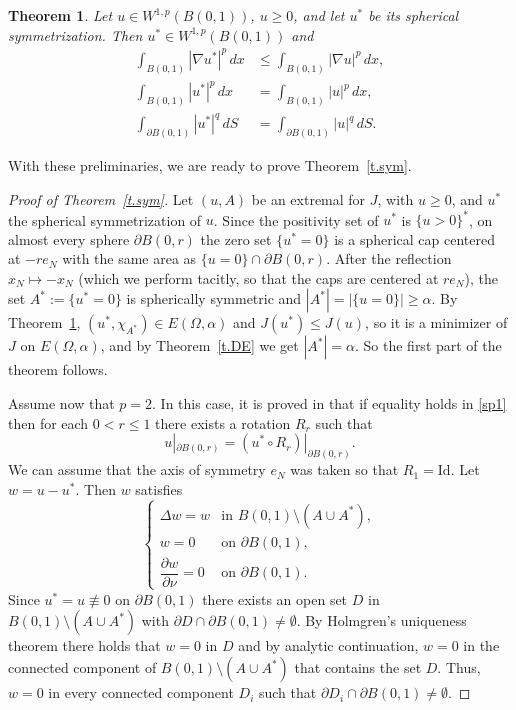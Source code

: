 \documentclass[11pt]{amsart}
\newtheorem{theorem}{Theorem}[section]
\theoremstyle{remark}
\numberwithin{equation}{section}
\begin{document}
\begin{theorem}\label{t.sperner}
Let $u\in W^{1,p}(B(0,1))$, $u\ge0$, and let $u^*$ be its spherical symmetrization. Then $u^*\in W^{1,p}(B(0,1))$ and
\begin{align}
\int_{B(0,1)}|\nabla u^*|^p\,dx&\le\int_{B(0,1)}|\nabla u|^p\,dx,\label{sp1}\\
\int_{B(0,1)}|u^*|^p\,dx&=\int_{B(0,1)}|u|^p\,dx,\label{sp2}\\
\int_{\partial B(0,1)}|u^*|^q\,dS&=\int_{\partial B(0,1)}|u|^q\,dS.\label{sp3}
\end{align}
\end{theorem}

With these preliminaries, we are ready to prove Theorem~\ref{t.sym}.

\begin{proof}[Proof of Theorem~\ref{t.sym}]
Let $(u,A)$ be an extremal for $J$, with $u\ge0$, and $u^*$ the spherical symmetrization of $u$. Since the positivity set of $u^*$ is $\{u>0\}^*$, on almost every sphere $\partial B(0,r)$ the zero set $\{u^*=0\}$ is a spherical cap centered at $-re_N$ with the same area as $\{u=0\}\cap\partial B(0,r)$. After the reflection $x_N\mapsto-x_N$ (which we perform tacitly, so that the caps are centered at $re_N$), the set $A^*:=\{u^*=0\}$ is spherically symmetric and $|A^*|=|\{u=0\}|\ge\alpha$. By Theorem~\ref{t.sperner}, $(u^*,\chi_{A^*})\in E(\Omega,\alpha)$ and $J(u^*)\le J(u)$, so it is a minimizer of $J$ on $E(\Omega,\alpha)$, and by Theorem~\ref{t.DE} we get $|A^*|=\alpha$. So the first part of the theorem follows.

Assume now that $p=2$. In this case, it is proved in \cite{De} that if equality holds in \eqref{sp1} then for each $0<r\le1$ there exists a rotation $R_r$ such that
\begin{equation}\label{rot}
u|_{\partial B(0,r)}=(u^*\circ R_r)|_{\partial B(0,r)}.
\end{equation}
We can assume that the axis of symmetry $e_N$ was taken so that $R_1=\mathrm{Id}$. Let $w=u-u^*$. Then $w$ satisfies
\[
\begin{cases}
\Delta w=w & \text{in } B(0,1)\setminus(A\cup A^*),\\
w=0 & \text{on }\partial B(0,1),\\
\dfrac{\partial w}{\partial\nu}=0 & \text{on }\partial B(0,1).
\end{cases}
\]
Since $u^*=u\not\equiv0$ on $\partial B(0,1)$ there exists an open set $D$ in $B(0,1)\setminus(A\cup A^*)$ with $\partial D\cap\partial B(0,1)\neq\emptyset$. By Holmgren's uniqueness theorem there holds that $w=0$ in $D$ and by analytic continuation, $w=0$ in the connected component of $B(0,1)\setminus(A\cup A^*)$ that contains the set $D$. Thus, $w=0$ in every connected component $D_i$ such that $\partial D_i\cap\partial B(0,1)\neq\emptyset$.


\end{proof}
\end{document}
